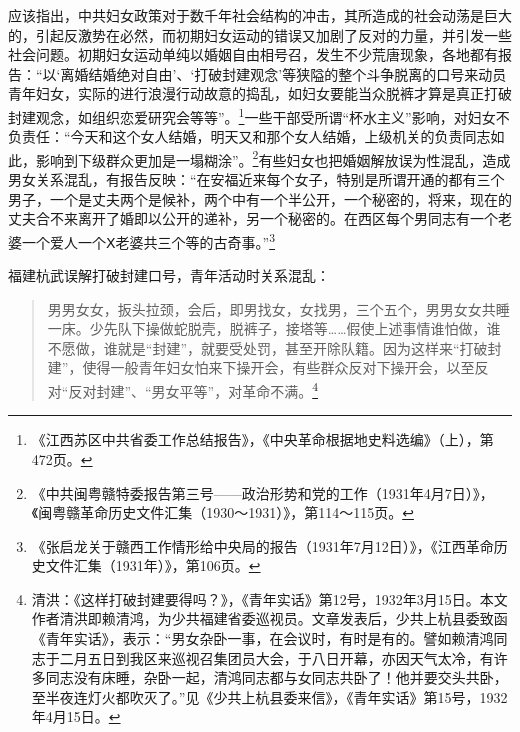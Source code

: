 应该指出，中共妇女政策对于数千年社会结构的冲击，其所造成的社会动荡是巨大的，引起反激势在必然，而初期妇女运动的错误又加剧了反对的力量，并引发一些社会问题。初期妇女运动单纯以婚姻自由相号召，发生不少荒唐现象，各地都有报告：“以‘离婚结婚绝对自由’、‘打破封建观念’等狭隘的整个斗争脱离的口号来动员青年妇女，实际的进行浪漫行动故意的捣乱，如妇女要能当众脱裤才算是真正打破封建观念，如组织恋爱研究会等等”。\footnote{《江西苏区中共省委工作总结报告》，《中央革命根据地史料选编》（上），第472页。}一些干部受所谓“杯水主义”影响，对妇女不负责任：“今天和这个女人结婚，明天又和那个女人结婚，上级机关的负责同志如此，影响到下级群众更加是一塌糊涂”。\footnote{《中共闽粤赣特委报告第三号——政治形势和党的工作（1931年4月7日）》，《闽粤赣革命历史文件汇集（1930～1931）》，第114～115页。}有些妇女也把婚姻解放误为性混乱，造成男女关系混乱，有报告反映：“在安福近来每个女子，特别是所谓开通的都有三个男子，一个是丈夫两个是候补，两个中有一个半公开，一个秘密的，将来，现在的丈夫合不来离开了婚即以公开的递补，另一个秘密的。在西区每个男同志有一个老婆一个爱人一个Ⅹ老婆共三个等的古奇事。”\footnote{《张启龙关于赣西工作情形给中央局的报告（1931年7月12日）》，《江西革命历史文件汇集（1931年）》，第106页。}


福建杭武误解打破封建口号，青年活动时关系混乱：

\begin{quote}

男男女女，扳头拉颈，会后，即男找女，女找男，三个五个，男男女女共睡一床。少先队下操做蛇脱壳，脱裤子，接塔等……假使上述事情谁怕做，谁不愿做，谁就是“封建”，就要受处罚，甚至开除队籍。因为这样来“打破封建”，使得一般青年妇女怕来下操开会，有些群众反对下操开会，以至反对“反对封建”、“男女平等”，对革命不满。\footnote{清洪：《这样打破封建要得吗？》，《青年实话》第12号，1932年3月15日。本文作者清洪即赖清鸿，为少共福建省委巡视员。文章发表后，少共上杭县委致函《青年实话》，表示：“男女杂卧一事，在会议时，有时是有的。譬如赖清鸿同志于二月五日到我区来巡视召集团员大会，于八日开幕，亦因天气太冷，有许多同志没有床睡，杂卧一起，清鸿同志都与女同志共卧了！他并要交头共卧，至半夜连灯火都吹灭了。”见《少共上杭县委来信》，《青年实话》第15号，1932年4月15日。}
\end{quote}


